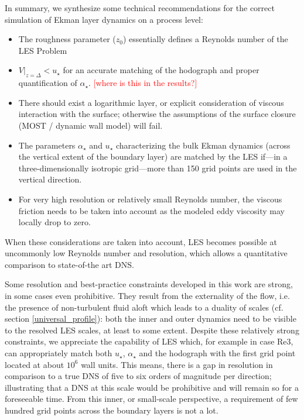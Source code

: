 \documentclass[a4paper,11pt]{article}
\newcommand{\todo}[1]{\textcolor{red}{$[$#1$]$}}
\begin{document}
In summary, we synthesize some technical recommendations for the correct simulation of Ekman layer dynamics on a process level:
\begin{itemize}
\item The roughness parameter ($z_0$) essentially defines a Reynolds number of the LES Problem
\item $V|_{z=\Delta} < u_\star$ for an accurate matching of the hodograph and proper quantification of $\alpha_\star$. \todo{where is this in the results?}
\item There should exist a logarithmic layer, or explicit consideration of viscous interaction with the surface; otherwise the assumptions of the surface closure (MOST / dynamic wall model) will fail.
\item The parameters $\alpha_\star$ and $u_\star$ characterizing the bulk Ekman dynamics (across the vertical extent of the boundary layer) are matched by the LES if---in a three-dimensionally isotropic grid---more than 150 grid points are used in the vertical direction.
\item For very high resolution or relatively small Reynolds number, the viscous friction needs to be taken into account as the modeled eddy viscosity may locally drop to zero.
\end{itemize}

When these considerations are taken into account, LES becomes possible at uncommonly low Reynolds number and resolution, which allows a quantitative comparison to state-of-the art DNS.

Some resolution and best-practice constraints developed in this work are strong, in some cases even prohibitive. They result from the externality of the flow, i.e. the presence of non-turbulent fluid aloft which leads to a duality of scales (cf. section \ref{universal_profile}): both the inner and outer dynamics need to be visible to the resolved LES scales, at least to some extent. Despite these relatively strong constraints, we appreciate the capability of LES which, for example in case Re3, can appropriately match both $u_\star$, $\alpha_\star$ and the hodograph with the first grid point located at about $10^6$ wall units. This means, there is a gap in resolution in comparison to a true DNS of five to six orders of magnitude per direction; illustrating that a DNS at this scale would be prohibitive and will remain so for a foreseeable time. From this inner, or small-scale perspective, a requirement of few hundred grid points across the boundary layers is not a lot.
\end{document}
